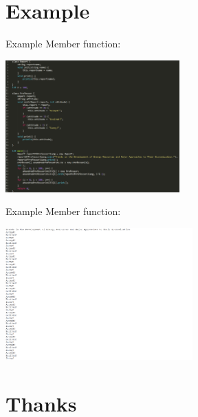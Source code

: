 \documentclass{beamer}
\begin{document}
	\section{Example} %
	\label{sec:example}
	
	\begin{frame}
		\begin{block}{Example}
		Member function:

		\centering
		\includegraphics[height=2in]{applyForProfessor.png}
		\end{block}
	\end{frame}

	\begin{frame}
		\begin{block}{Example}
		Member function:

		\centering
		\includegraphics[height=2in]{professor.png}
		\end{block}
	\end{frame}
	
	\section{Thanks} %
	\label{sec:thanks}
	
\end{document}
